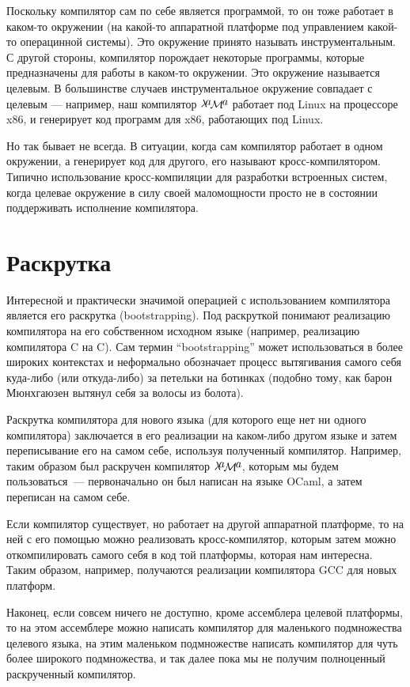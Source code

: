 \documentclass{article}
\newcommand{\lama}{$\lambda\kern -.1667em\lower -.5ex\hbox{$a$}\kern -.1000em\lower .2ex\hbox{$\mathcal M$}\kern -.1000em\lower -.5ex\hbox{$a$}$\xspace}
\begin{document}
Поскольку компилятор сам по себе является программой, то он тоже работает в каком-то окружении (на какой-то аппаратной платформе
под управлением какой-то операцинной системы). Это окружение принято называть инструментальным. С другой стороны, компилятор порождает
некоторые программы, которые предназначены для работы в каком-то окружении. Это окружение называется целевым. В большинстве случаев
инструментальное окружение совпадает с целевым --- например, наш компилятор \lama работает под Linux на процессоре x86, и генерирует
код программ для x86, работающих под Linux.

Но так бывает не всегда. В ситуации, когда сам компилятор работает в одном окружении, а генерирует код для другого, его
называют кросс-компилятором. Типично использование кросс-компиляции для разработки встроенных систем, когда целевае окружение
в силу своей маломощности просто не в состоянии поддерживать исполнение компилятора. 

\section{Раскрутка}

Интересной и практически значимой операцией с использованием компилятора является его раскрутка (bootstrapping).
Под раскруткой понимают реализацию компилятора на его собственном исходном языке (например, реализацию компилятора C на C). Сам термин
``bootstrapping'' может использоваться в более широких контекстах и неформально обозначает процесс вытягивания самого себя куда-либо
(или откуда-либо) за петельки на ботинках (подобно тому, как барон Мюнхгаюзен вытянул себя за волосы из болота).

Раскрутка компилятора для нового языка (для которого еще нет ни одного компилятора) заключается в его реализации на каком-либо
другом языке и затем переписывание его на самом себе, используя полученный компилятор. Например, таким образом был раскручен компилятор \lama,
которым мы будем пользоваться~--- первоначально он был написан на языке OCaml, а затем переписан на самом себе.

Если компилятор существует, но работает на другой аппаратной платформе, то на ней с его помощью можно реализовать кросс-компилятор,
которым затем можно откомпилировать самого себя в код той платформы, которая нам интересна. Таким образом, например, получаются
реализации компилятора GCC для новых платформ.

Наконец, если совсем ничего не доступно, кроме ассемблера целевой платформы, то на этом ассемблере можно написать компилятор для
маленького подмножества целевого языка, на этим маленьком подмножестве написать компилятор для чуть более широкого подмножества, и
так далее пока мы не получим полноценный раскрученный компилятор.
\end{document}
